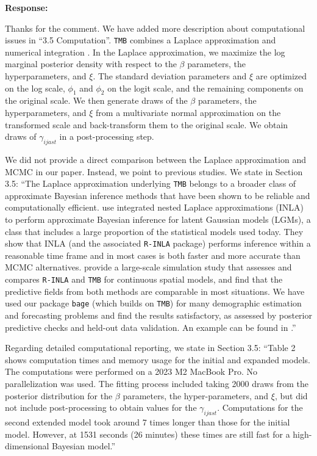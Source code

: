 \documentclass[11pt,a4paper]{article}
\newlength{\replyspace}
\newenvironment{response}{\par\addvspace{\replyspace}\nopagebreak\textbf{\textcolor{replyblue}{Response:}}\par\begingroup\color{replyblue}}{\par\endgroup\vspace{\replyspace}}
\begin{document}
\begin{response}
Thanks for the comment. We have added more description about computational issues in ``3.5 Computation''. \texttt{TMB} combines a Laplace approximation and numerical integration \citep{kristensen2016tmb,osgood2023statistical}. In the Laplace approximation, we maximize the log marginal posterior density with respect to the $\beta$ parameters, the hyperparameters, and $\xi$. The standard deviation parameters and 
$\xi$ are optimized on the log scale, $\phi_1$ and $\phi_2$ on the logit scale, and the remaining components on the original scale. We then generate draws of the $\beta$ parameters, the hyperparameters, and $\xi$ 
from a multivariate normal approximation on the transformed scale and back-transform them to the original scale. We obtain draws of $\gamma_{ijast}$ in a post-processing step.

We did not provide a direct comparison between the Laplace approximation and MCMC in our paper. Instead, we point to previous studies. We state in Section 3.5: ``The Laplace approximation underlying \texttt{TMB} belongs to a broader class of approximate Bayesian inference methods that have been shown to be reliable and computationally efficient. \citet{rue2017bayesian} use integrated nested Laplace approximations (INLA) to perform approximate Bayesian inference for latent Gaussian models (LGMs), a class that includes a large proportion of the statistical models used today. They show that INLA (and the associated \texttt{R-INLA} package) performs inference within a reasonable time frame and in most cases is both faster and more accurate than MCMC alternatives. \citet{osgood2023statistical} provide a large-scale simulation study that assesses and compares \texttt{R-INLA} and \texttt{TMB} for continuous spatial models, and find that the predictive fields from both methods are comparable in most situations. We have used our package \texttt{bage} (which builds on \texttt{TMB}) for many demographic estimation and forecasting problems and find the results satisfactory, as assessed by posterior predictive checks and held-out data validation. An example can be found in \citet{bryant2026estimating}.''

Regarding detailed computational reporting, we state in Section 3.5: ``Table 2 shows computation times and memory usage for the initial and expanded models. The computations were performed on a 2023 M2 MacBook Pro. No parallelization was used. The fitting process included taking 2000 draws from the posterior distribution for the $\beta$ parameters, the hyper-parameters, and $\xi$, but did not include post-processing to obtain values for the $\gamma_{ijast}$. Computations for the second extended model took around 7 times longer than those for the initial model. However, at 1531 seconds (26 minutes) these times are still fast for a high-dimensional Bayesian model.''


\end{response}
\end{document}
